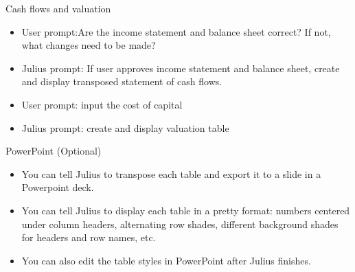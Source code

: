 \documentclass[10pt]{beamer}
\begin{document}
\begin{frame}{Cash flows and valuation}
    \begin{itemize}
        \item User prompt:Are the income statement and balance sheet correct?  If not, what changes need to be made?
        \item Julius prompt: If user approves income statement and balance sheet, create and display transposed statement of cash flows.
        \item User prompt: input the cost of capital
        \item Julius prompt: create and display valuation table
    \end{itemize}
\end{frame}


\begin{frame}{PowerPoint (Optional)}
    \begin{itemize}
        \item You can tell Julius to transpose each table and export it to a slide in a Powerpoint deck.
        \item You can tell Julius to display each table in a pretty format: numbers centered under column headers, alternating row shades, different background shades for headers and row names, etc.
        \item You can also edit the table styles in PowerPoint after Julius finishes.
    \end{itemize}
\end{frame}
\end{document}
